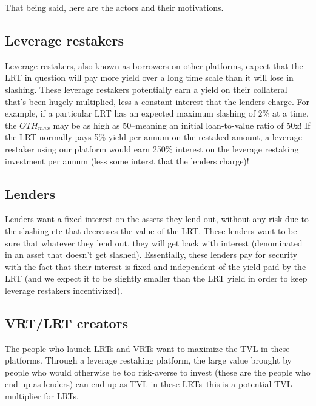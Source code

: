 \documentclass{article}
\begin{document}
That being said, here are the actors and their motivations.

\subsection{Leverage restakers}
Leverage restakers, also known as borrowers on other platforms, expect that the LRT in question will pay more yield over a long time scale than it will lose in slashing. These leverage restakers potentially earn a yield on their collateral that's been hugely multiplied, less a constant interest that the lenders charge. For example, if a particular LRT has an expected maximum slashing of $2\%$ at a time, the $\textit{OTH}_\textit{max}$ may be as high as 50--meaning an initial loan-to-value ratio of 50x! If the LRT normally pays 5\% yield per annum on the restaked amount, a leverage restaker using our platform would earn 250\% interest on the leverage restaking investment per annum (less some interst that the lenders charge)!

\subsection{Lenders}
Lenders want a fixed interest on the assets they lend out, without any risk due to the slashing etc that decreases the value of the LRT. These lenders want to be sure that whatever they lend out, they will get back with interest (denominated in an asset that doesn't get slashed). Essentially, these lenders pay for security with the fact that their interest is fixed and independent of the yield paid by the LRT (and we expect it to be slightly smaller than the LRT yield in order to keep leverage restakers incentivized).

\subsection{VRT/LRT creators}
The people who launch LRTs and VRTs want to maximize the TVL in these platforms. Through a leverage restaking platform, the large value brought by people who would otherwise be too risk-averse to invest (these are the people who end up as lenders) can end up as TVL in these LRTs--this is a potential TVL multiplier for LRTs.

\printbibliography
\end{document}
